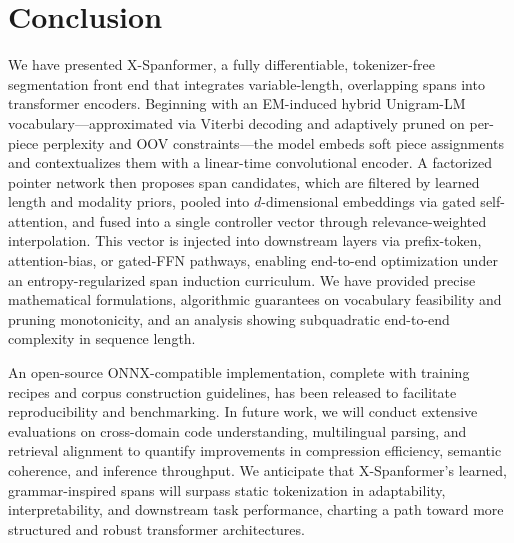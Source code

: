 \section{Conclusion}

We have presented X-Spanformer, a fully differentiable, tokenizer-free segmentation front end that integrates variable-length, overlapping spans into transformer encoders.  Beginning with an EM-induced hybrid Unigram-LM vocabulary—approximated via Viterbi decoding and adaptively pruned on per-piece perplexity and OOV constraints—the model embeds soft piece assignments and contextualizes them with a linear-time convolutional encoder.  A factorized pointer network then proposes span candidates, which are filtered by learned length and modality priors, pooled into \(d\)-dimensional embeddings via gated self-attention, and fused into a single controller vector through relevance-weighted interpolation.  This vector is injected into downstream layers via prefix-token, attention-bias, or gated-FFN pathways, enabling end-to-end optimization under an entropy-regularized span induction curriculum.  We have provided precise mathematical formulations, algorithmic guarantees on vocabulary feasibility and pruning monotonicity, and an analysis showing subquadratic end-to-end complexity in sequence length.

An open-source ONNX-compatible implementation, complete with training recipes and corpus construction guidelines, has been released to facilitate reproducibility and benchmarking.  In future work, we will conduct extensive evaluations on cross-domain code understanding, multilingual parsing, and retrieval alignment to quantify improvements in compression efficiency, semantic coherence, and inference throughput.  We anticipate that X-Spanformer’s learned, grammar-inspired spans will surpass static tokenization in adaptability, interpretability, and downstream task performance, charting a path toward more structured and robust transformer architectures.